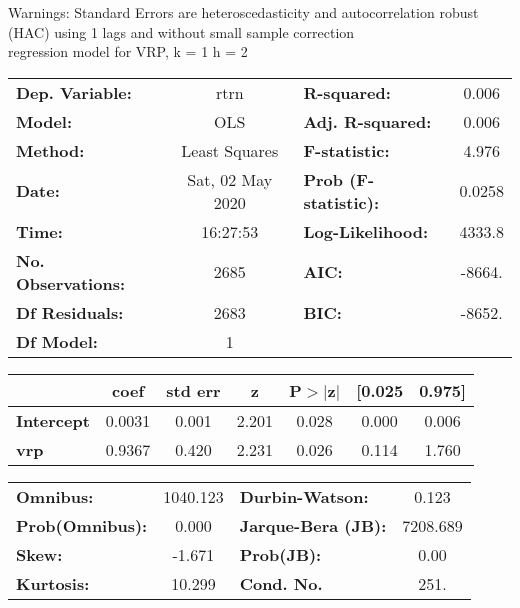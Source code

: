 Warnings: \newline
 [1] Standard Errors are heteroscedasticity and autocorrelation robust (HAC) using 1 lags and without small sample correction\\ 

regression model for VRP, k = 1 h = 2\begin{center}
\begin{tabular}{lclc}
\toprule
\textbf{Dep. Variable:}    &       rtrn       & \textbf{  R-squared:         } &     0.006   \\
\textbf{Model:}            &       OLS        & \textbf{  Adj. R-squared:    } &     0.006   \\
\textbf{Method:}           &  Least Squares   & \textbf{  F-statistic:       } &     4.976   \\
\textbf{Date:}             & Sat, 02 May 2020 & \textbf{  Prob (F-statistic):} &   0.0258    \\
\textbf{Time:}             &     16:27:53     & \textbf{  Log-Likelihood:    } &    4333.8   \\
\textbf{No. Observations:} &        2685      & \textbf{  AIC:               } &    -8664.   \\
\textbf{Df Residuals:}     &        2683      & \textbf{  BIC:               } &    -8652.   \\
\textbf{Df Model:}         &           1      & \textbf{                     } &             \\
\bottomrule
\end{tabular}
\begin{tabular}{lcccccc}
                   & \textbf{coef} & \textbf{std err} & \textbf{z} & \textbf{P$> |$z$|$} & \textbf{[0.025} & \textbf{0.975]}  \\
\midrule
\textbf{Intercept} &       0.0031  &        0.001     &     2.201  &         0.028        &        0.000    &        0.006     \\
\textbf{vrp}       &       0.9367  &        0.420     &     2.231  &         0.026        &        0.114    &        1.760     \\
\bottomrule
\end{tabular}
\begin{tabular}{lclc}
\textbf{Omnibus:}       & 1040.123 & \textbf{  Durbin-Watson:     } &    0.123  \\
\textbf{Prob(Omnibus):} &   0.000  & \textbf{  Jarque-Bera (JB):  } & 7208.689  \\
\textbf{Skew:}          &  -1.671  & \textbf{  Prob(JB):          } &     0.00  \\
\textbf{Kurtosis:}      &  10.299  & \textbf{  Cond. No.          } &     251.  \\
\bottomrule
\end{tabular}
\end{center}

